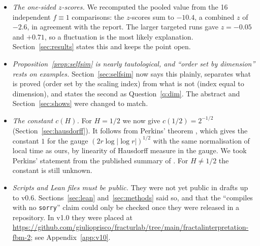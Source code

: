 \documentclass[11pt]{article}
\theoremstyle{remark}
\theoremstyle{definition}
\begin{document}
\begin{itemize}
\item \emph{The one-sided $z$-scores.} We recomputed the pooled value from the 16 independent $f\equiv1$ comparisons: the $z$-scores sum to $-10.4$, a combined $z$ of $-2.6$, in agreement with the report. The larger targeted runs gave $z=-0.05$ and $+0.71$, so a fluctuation is the most likely explanation. Section~\ref{sec:results} states this and keeps the point open.
\item \emph{Proposition~\ref{prop:selfsim} is nearly tautological, and ``order set by dimension'' rests on examples.} Section~\ref{sec:selfsim} now says this plainly, separates what is proved (order set by the scaling index) from what is not (index equal to dimension), and states the second as Question~\ref{q:dim}. The abstract and Section~\ref{sec:shows} were changed to match.
\item \emph{The constant $c(H)$.} For $H=1/2$ we now give $c(1/2)=2^{-1/2}$ (Section~\ref{sec:hausdorff}). It follows from Perkins' theorem \cite{Per81}, which gives the constant $1$ for the gauge $(2r\log|\log r|)^{1/2}$ with the same normalisation of local time as ours, by linearity of Hausdorff measure in the gauge. We took Perkins' statement from the published summary of \cite{Per81}. For $H\neq1/2$ the constant is still unknown.
\item \emph{Scripts and Lean files must be public.} They were not yet public in drafts up to v0.6. Sections~\ref{sec:lean} and~\ref{sec:methods} said so, and that the ``compiles with no \texttt{sorry}'' claim could only be checked once they were released in a repository. In v1.0 they were placed at \url{https://github.com/giulioprisco/fracturlab/tree/main/fractalinterpretation-fbm-2}; see Appendix~\ref{app:v10}.
\end{itemize}
\end{document}
